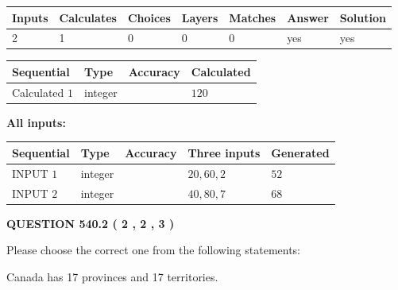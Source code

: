 \documentclass[12pt]{article}
\begin{document}
 

 
   
   
   
   
\noindent\begin{tabular}{|l|l|l|l|l|l|l|}
 \hline
Inputs & Calculates & Choices & Layers & Matches & Answer & Solution \\ \hline
 2  & 
 1  & 
 0
  & 
 0  & 
 0  & 
  yes & 
  yes 
  \\ \hline
 \end{tabular}
   
   
   
   
\noindent{}
   
   
  
  
\noindent\begin{tabular}{|l|l|l|l|}
\hline
 Sequential & Type & Accuracy & Calculated \\ 
\hline
 
 
  Calculated $  1 $ & integer &  & 
  $ 120 $ 
 \\  \hline  
 \end{tabular}
   
   
   
   
\noindent\vspace{0.1in}\hspace{-0.08in} {\textbf{\Large{All inputs: }}}
   
   
  
  
\noindent\begin{tabular}{|l|l|l|l|l|}
\hline
 Sequential & Type & Accuracy & Three inputs & Generated \\ 
\hline
 
 
  INPUT $  1 $ & integer &  & $
 20
 , 
 60
 , 
 2
 $ & $ 52 $ 
 \\  \hline  
 
 
  INPUT $  2 $ & integer &  & $
 40
 , 
 80
 , 
 7
 $ & $ 68 $ 
 \\  \hline  
 \end{tabular}
   
   
  
\vspace{0.2in}
  
{\textbf{\Large{QUESTION
540.2 
 ( 2 , 2 , 3 )
}}}
  
  
Please choose the correct one from the following statements:
 
 
Canada has  17 provinces and  17 territories.
 
\end{document}
